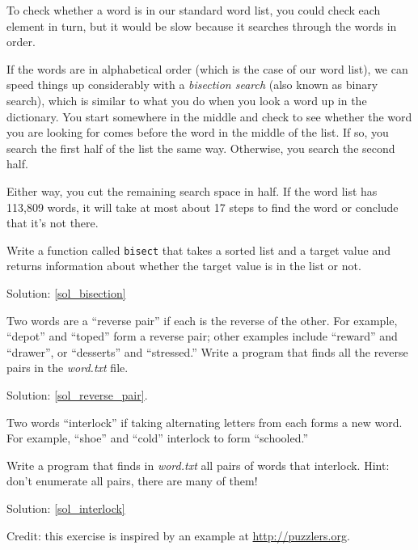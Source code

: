\begin{exercise}
\label{bisection}

To check whether a word is in our standard word list, 
you could check each element in turn, but it would be 
slow because it searches through the words in order.

If the words are in alphabetical order (which is the 
case of our word list), we can speed 
things up considerably with a \emph{bisection search} (also 
known as binary search), which is similar to what you 
do when you look a word up in the dictionary.  You
start somewhere in the middle and check to see whether 
the word you are looking for comes before the word in 
the middle of the list.  If so, you search the first 
half of the list the same way.  Otherwise, you search
the second half.

Either way, you cut the remaining search space in half. 
If the word list has 113,809 words, it will take at 
most about 17 steps to find the word or conclude that 
it's not there.

Write a function called \verb"bisect" that takes a 
sorted list and a target value and returns information 
about whether the target value is in the list or not.

Solution: \ref{sol_bisection}

\end{exercise}

\begin{exercise}
\label{reverse_pair}

Two words are a ``reverse pair'' if each is the reverse 
of the other.  For example, ``depot'' and ``toped'' form 
a reverse pair; other examples include ``reward'' and 
``drawer'', or ``desserts'' and ``stressed.'' Write a 
program that finds all the reverse pairs in the \emph{word.txt}
file.

Solution: \ref{sol_reverse_pair}.

\end{exercise}

\begin{exercise}
\label{interlock}

Two words ``interlock'' if taking alternating letters from 
each forms a new word.  For example, ``shoe'' and ``cold''
interlock to form ``schooled.''

Write a program that finds in \emph{word.txt} all pairs of 
words that interlock. Hint: don't enumerate all pairs, there 
are many of them!

Solution: \ref{sol_interlock}

Credit: this exercise is inspired by an example at \url{http://puzzlers.org}.

\end{exercise}


